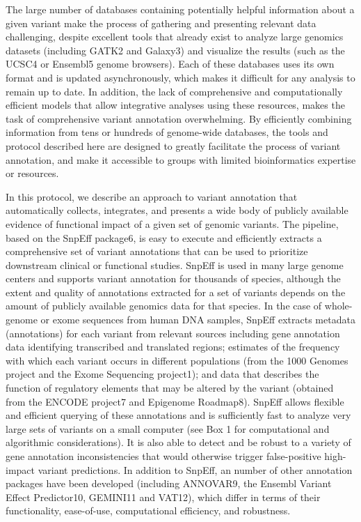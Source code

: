 The large number of databases containing potentially helpful information about a given variant make the process of gathering and presenting relevant data challenging, despite excellent tools that already exist to analyze large genomics datasets (including GATK2 and Galaxy3) and visualize the results (such as the UCSC4 or Ensembl5 genome browsers). Each of these databases uses its own format and is updated asynchronously, which makes it difficult for any analysis to remain up to date. In addition, the lack of comprehensive and computationally efficient models that allow integrative analyses using these resources, makes the task of comprehensive variant annotation overwhelming. By efficiently combining information from tens or hundreds of genome-wide databases, the tools and protocol described here are designed to greatly facilitate the process of variant annotation, and make it accessible to groups with limited bioinformatics expertise or resources.

In this protocol, we describe an approach to variant annotation that automatically collects, integrates, and presents a wide body of publicly available evidence of functional impact of a given set of genomic variants. The pipeline, based on the SnpEff package6, is easy to execute and efficiently extracts a comprehensive set of variant annotations that can be used to prioritize downstream clinical or functional studies. SnpEff is used in many large genome centers and supports variant annotation for thousands of species, although the extent and quality of annotations extracted for a set of variants depends on the amount of publicly available genomics data for that species. In the case of whole-genome or exome sequences from human DNA samples, SnpEff extracts metadata (annotations) for each variant from relevant sources including gene annotation data identifying transcribed and translated regions; estimates of the frequency with which each variant occurs in different populations (from the 1000 Genomes project and the Exome Sequencing project1); and data that describes the function of regulatory elements that may be altered by the variant (obtained from the ENCODE project7 and Epigenome Roadmap8). SnpEff allows flexible and efficient querying of these annotations and is sufficiently fast to analyze very large sets of variants on a small computer (see Box 1 for computational and algorithmic considerations). It is also able to detect and be robust to a variety of gene annotation inconsistencies that would otherwise trigger false-positive high-impact variant predictions. In addition to SnpEff, an number of other annotation packages have been developed (including ANNOVAR9, the Ensembl Variant Effect Predictor10, GEMINI11 and VAT12), which differ in terms of their functionality, ease-of-use, computational efficiency, and robustness.

